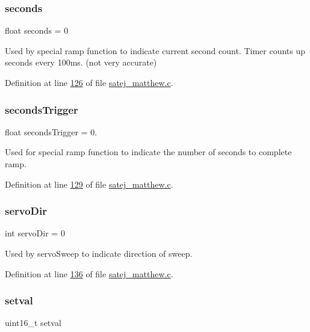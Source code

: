 \subsubsection{\texorpdfstring{seconds}{seconds}}
{\footnotesize\ttfamily float seconds = 0}

Used by special ramp function to indicate current second count. Timer counts up seconds every 100ms. (not very accurate) 

Definition at line \mbox{\hyperlink{satej__matthew_8c_source_l00126}{126}} of file \mbox{\hyperlink{satej__matthew_8c_source}{satej\+\_\+matthew.\+c}}.

\mbox{\label{satej__matthew_8c_ab7e143110d340e731fa81edab74b60dd}} 
\subsubsection{\texorpdfstring{secondsTrigger}{secondsTrigger}}
{\footnotesize\ttfamily float seconds\+Trigger = 0.}

Used for special ramp function to indicate the number of seconds to complete ramp. 

Definition at line \mbox{\hyperlink{satej__matthew_8c_source_l00129}{129}} of file \mbox{\hyperlink{satej__matthew_8c_source}{satej\+\_\+matthew.\+c}}.

\mbox{\label{satej__matthew_8c_a4569da2d36a3fe621d19ed0ffad1a67b}} 
\subsubsection{\texorpdfstring{servoDir}{servoDir}}
{\footnotesize\ttfamily int servo\+Dir = 0}

Used by servo\+Sweep to indicate direction of sweep. 

Definition at line \mbox{\hyperlink{satej__matthew_8c_source_l00136}{136}} of file \mbox{\hyperlink{satej__matthew_8c_source}{satej\+\_\+matthew.\+c}}.

\mbox{\label{satej__matthew_8c_a3be316f37343a45da2f52754d352df9b}} 
\subsubsection{\texorpdfstring{setval}{setval}}
{\footnotesize\ttfamily uint16\+\_\+t setval}


